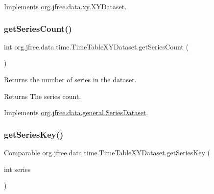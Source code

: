 Implements \mbox{\hyperlink{interfaceorg_1_1jfree_1_1data_1_1xy_1_1_x_y_dataset_ae81f9de91dfcae45028fc8a486a119da}{org.\+jfree.\+data.\+xy.\+X\+Y\+Dataset}}.

\mbox{\label{classorg_1_1jfree_1_1data_1_1time_1_1_time_table_x_y_dataset_a51ec8920b7c12d2f8bcc8cd53e71b452}} 
\subsubsection{\texorpdfstring{get\+Series\+Count()}{getSeriesCount()}}
{\footnotesize\ttfamily int org.\+jfree.\+data.\+time.\+Time\+Table\+X\+Y\+Dataset.\+get\+Series\+Count (\begin{DoxyParamCaption}{ }\end{DoxyParamCaption})}

Returns the number of series in the dataset.

\begin{DoxyReturn}{Returns}
The series count. 
\end{DoxyReturn}


Implements \mbox{\hyperlink{interfaceorg_1_1jfree_1_1data_1_1general_1_1_series_dataset_a84fe822f5918f941d9de1ed1b73c9f58}{org.\+jfree.\+data.\+general.\+Series\+Dataset}}.

\mbox{\label{classorg_1_1jfree_1_1data_1_1time_1_1_time_table_x_y_dataset_ada264bb4617f16122facd70f37cb4c46}} 
\subsubsection{\texorpdfstring{get\+Series\+Key()}{getSeriesKey()}}
{\footnotesize\ttfamily Comparable org.\+jfree.\+data.\+time.\+Time\+Table\+X\+Y\+Dataset.\+get\+Series\+Key (\begin{DoxyParamCaption}\item[{int}]{series }\end{DoxyParamCaption})}

